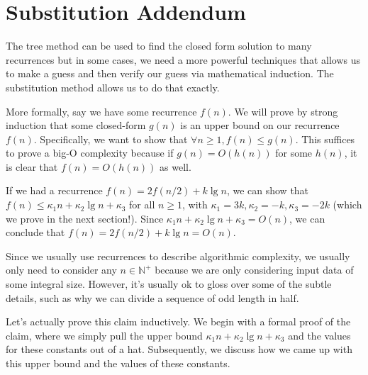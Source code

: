 \chapter{Substitution Addendum}
\label{ch:analysis::substitution}

\begin{gram}
The tree method can be used to find the closed form solution to many
recurrences but in some cases, we need a more powerful techniques that
allows us to make a guess and then verify our guess via mathematical induction.
%
The substitution method allows us to do that exactly.
%
\end{gram}

\begin{gram}
More formally, say we have some recurrence $f(n)$. We will prove by strong induction
that some closed-form $g(n)$ is an upper bound on our recurrence $f(n)$.
Specifically, we want to show that $\forall n \geq 1, f(n) \leq g(n)$.
This suffices to prove a big-O complexity because if $g(n) = O(h(n))$ for some
$h(n)$, it is clear that $f(n) = O(h(n))$ as well.
\end{gram}

\begin{example}
If we had a recurrence $f(n) = 2 f(n/2) + k \lg n$, we can show that
$f(n) \leq \kappa_1 n + \kappa_2 \lg n + \kappa_3$ for all $n \geq 1$, with
$\kappa_1 = 3k, \kappa_2 = -k, \kappa_3 = -2k$ (which we prove in the next
section!). Since $\kappa_1 n + \kappa_2 \lg n + \kappa_3 = O(n)$, we can
conclude that $f(n) = 2 f(n/2) + k \lg n = O(n)$.
\end{example}

\begin{note}
Since we usually use recurrences to describe algorithmic complexity,
we usually only need to consider any $n \in \mathbb{N}^+$ because we are only
considering input data of some integral size. However, it's usually ok
to gloss over some of the subtle details, such as why we can divide a sequence
of odd length in half.
\end{note}

\begin{gram}
Let's actually prove this claim inductively.
We begin with a formal proof of the claim, where we simply
pull the upper bound $\kappa_1 n + \kappa_2 \lg n + \kappa_3$ and the values
for these constants out of a hat. Subsequently, we discuss how we came up with
this upper bound and the values of these constants.
\end{gram}

